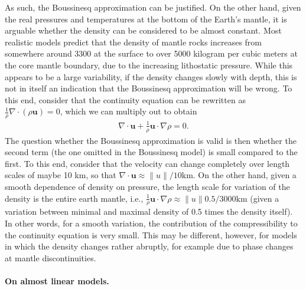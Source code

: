 \documentclass{article}
\begin{document}
As such, the Boussinesq approximation can be justified. On the other hand,
given the real pressures and temperatures at the bottom of the Earth's mantle,
it is arguable whether the density can be considered to be almost
constant. Most realistic models predict that the density of mantle rocks
increases from somewhere around 3300 at the surface to over 5000 kilogram per
cubic meters at the core mantle boundary, due to the increasing lithostatic
pressure. While this appears to be a large variability, if the density changes
slowly with depth, this is not in itself an indication that the Boussinesq
approximation will be wrong. To this end, consider that the continuity
equation can be rewritten as $\frac 1\rho \nabla \cdot (\rho \mathbf u)=0$,
which we can multiply out to obtain
\begin{gather*}
  \nabla \cdot \mathbf u
  +
  \frac 1\rho \mathbf u \cdot \nabla \rho
  = 0.
\end{gather*}
The question whether the Boussinesq approximation is valid is then whether the
second term (the one omitted in the Boussinesq model) is small compared to the
first. To this end, consider that the velocity can change completely over length
scales of maybe 10 km, so that $\nabla \cdot\mathbf u \approx \|u\| /
10\text{km}$. On the other hand, given a smooth dependence of density on pressure,
the length scale for variation of the density is the entire earth mantle,
i.e., $\frac 1\rho \mathbf u \cdot \nabla\rho \approx \|u\| 0.5 / 3000 \text{km}$
(given a variation between minimal and maximal density of 0.5 times the
density itself). In other words, for a smooth variation, the contribution of
the compressibility to the continuity equation is very small. This may be
different, however, for models in which the density changes rather abruptly,
for example due to phase changes at mantle discontinuities.

\paragraph{On almost linear models.}
\end{document}
